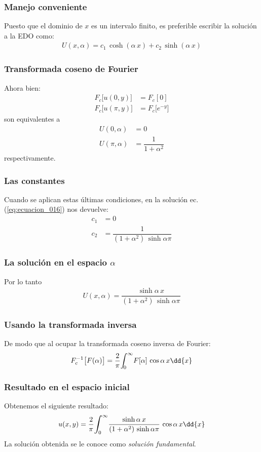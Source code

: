 \begin{frame}
\frametitle{Manejo conveniente}
Puesto que el dominio de $x$ es un intervalo finito, es preferible escribir la solución a la EDO como:
\begin{align}
U(x, \alpha) = c_{1} \, \cosh (\alpha \, x) + c_{2} \, \sinh (\alpha \, x)
\label{eq:ecuacion_016}
\end{align}
\end{frame}
\begin{frame}
\frametitle{Transformada coseno de Fourier}
Ahora bien:
\begin{align*}
F_{c} \big[ u(0, y)\big] &= F_{c} [0] \\[0.5em]
F_{c} \big[ u(\pi, y)\big] &= F_{c} \big[ e^{-y} \big]
\end{align*}
son equivalentes a
\begin{align*}
U(0, \alpha) &= 0 \\[0.5em]
U(\pi, \alpha) &= \dfrac{1}{1 +  \alpha^{2}}
\end{align*}
respectivamente.
\end{frame}
\begin{frame}
\frametitle{Las constantes}
Cuando se aplican estas últimas condiciones, en la solución ec. (\ref{eq:ecuacion_016}) nos devuelve:
\begin{align*}
c_{1} &= 0 \\[0.5em]
c_{2} &= \dfrac{1}{(1 + \alpha^{2}) \, \sinh \alpha \pi}
\end{align*}
\end{frame}
\begin{frame}
\frametitle{La solución en el espacio $\alpha$}
Por lo tanto
\begin{align*}
U(x, \alpha) = \dfrac{\sinh \alpha \, x}{(1 + \alpha^{2}) \, \sinh \alpha \pi}
\end{align*}
\end{frame}
\begin{frame}
\frametitle{Usando la transformada inversa}
De modo que al ocupar la transformada coseno inversa de Fourier:
\pause
\begin{align*}
F_{c}^{-1} \big[F(\alpha)\big] = \dfrac{2}{\pi} \scaleint{5ex}_{\bs 0}^{\infty} F[\alpha] \, \cos \alpha \, x \dd{x}
\end{align*}
\end{frame}
\begin{frame}
\frametitle{Resultado en el espacio inicial}
Obtenemos el siguiente resultado:
\pause
\begin{align*}
u(x, y) = \dfrac{2}{\pi} \scaleint{6ex}_{\bs 0}^{\infty} \dfrac{\sinh \alpha \, x}{(1 + \alpha^{2}) \, \sinh \alpha \pi} \, \cos \alpha \, x \dd{x}
\end{align*}
La solución obtenida se le conoce como \emph{solución fundamental}.
\end{frame}
